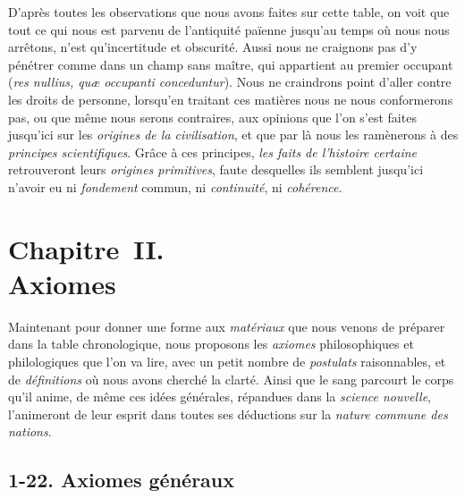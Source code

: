 \documentclass[french,twoside]{book} %
\newcommand\chapteropen{} %
\newcommand\chaptercont{} %
\newcommand\chapterclose{} %
\begin{document}
\par
D’après toutes les observations que nous avons faites sur cette table, on voit que tout ce qui nous est parvenu de l’antiquité païenne jusqu’au temps où nous nous arrêtons, n’est qu’incertitude et obscurité.  Aussi nous ne craignons pas d’y pénétrer comme dans un champ sans maître, qui appartient au premier occupant ({\itshape res nullius, quæ occupanti conceduntur}). Nous ne craindrons point d’aller contre les droits de personne, lorsqu’en traitant ces matières nous ne nous conformerons pas, ou que même nous serons contraires, aux opinions que l’on s’est faites jusqu’ici sur les {\itshape origines de la civilisation}, et que par là nous les ramènerons à des {\itshape principes scientifiques}. Grâce à ces principes, {\itshape les faits de l’histoire certaine} retrouveront leurs {\itshape origines primitives}, faute desquelles ils semblent jusqu’ici n’avoir eu ni {\itshape fondement} commun, ni {\itshape continuité}, ni {\itshape cohérence}.
\chapterclose


\chapteropen
\chapter[{Chapitre II. Axiomes}]{Chapitre II. \\
Axiomes}

\chaptercont
\noindent  Maintenant pour donner une forme aux {\itshape matériaux} que nous venons de préparer dans la table chronologique, nous proposons les {\itshape axiomes} philosophiques et philologiques que l’on va lire, avec un petit nombre de {\itshape postulats} raisonnables, et de {\itshape définitions} où nous avons cherché la clarté. Ainsi que le sang parcourt le corps qu’il anime, de même ces idées générales, répandues dans la {\itshape science nouvelle}, l’animeront de leur esprit dans toutes ses déductions sur la {\itshape nature commune des nations}.\par
\section[{1-22. Axiomes généraux}]{1-22. Axiomes généraux}
\end{document}
